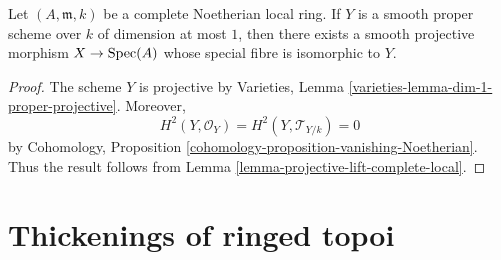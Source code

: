 \begin{lemma}
\label{lemma-smooth-proper-curve-lift-complete-local}
\begin{reference}
\cite[Expos\'e 182, Corollaire 4, p. 206]{FGA}
\end{reference}
Let $(A, \mathfrak m, k)$ be a complete Noetherian local ring. If $Y$ is
a smooth proper scheme over $k$ of dimension at most $1$, then there exists
a smooth projective morphism $X \to \mathop{\mathrm{Spec}}(A)$ whose special fibre is
isomorphic to $Y$.
\end{lemma}

\begin{proof}
The scheme $Y$ is projective by Varieties, Lemma
\ref{varieties-lemma-dim-1-proper-projective}. Moreover,
$$
H^2(Y, \mathcal{O}_Y) = H^2(Y, \mathcal{T}_{Y/k}) = 0
$$
by Cohomology, Proposition
\ref{cohomology-proposition-vanishing-Noetherian}. Thus the result follows
from Lemma \ref{lemma-projective-lift-complete-local}.
\end{proof}










\section{Thickenings of ringed topoi}
\label{section-thickenings-ringed-topoi}

